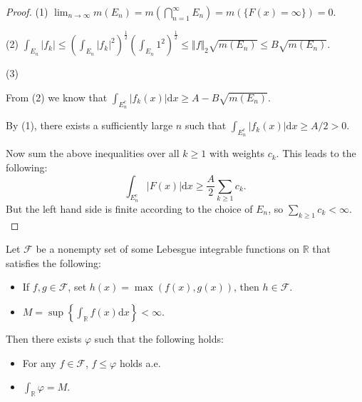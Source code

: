 \begin{proof}
(1)
$
\lim_{n\rightarrow \infty}m( E_n ) =m( \bigcap_{n=1}^{\infty}{E_n} ) =m( \{ F( x ) =\infty \} ) =0.
$
	
(2)
$
\int_{E_n}^{}{|f_k|}\le \left( \int_{E_n}^{}{|f_k|^2} \right) ^{\frac{1}{2}}\left( \int_{E_n}^{}{1^2} \right) ^{\frac{1}{2}}\le \Vert f \Vert_2\sqrt{m( E_n )}\le B\sqrt{m( E_n )}.
$

(3)%
%

From (2) we know that $\int_{E_n^c}|f_k(x)|\mathrm{d}x \ge A-B\sqrt{m(E_n)}$. 

By (1), there exists a sufficiently large $n$ such that $\int_{E_n^c}|f_k(x)|\mathrm{d}x \ge A/2 >0 $.

Now sum the above inequalities over all $k\ge 1$ with weights $c_k$. This leads to the following:
$$\int_{E_n^c}|F(x)|\mathrm{d}x\ge \frac{A}{2} \sum\limits_{k\ge 1}c_k.$$
But the left hand side is finite according to the choice of $E_n$, so $\sum\limits_{k\ge 1}c_k<\infty.$
\end{proof}

\begin{problem}
Let $ \mathcal{F}  $ be a nonempty set of some Lebesgue integrable functions on $ \mathbb{R}  $ that satisfies the following:
\begin{itemize}
\item If $ f,g\in \mathcal{F}  $, set $ h(x)=\max(f(x),g(x)) $, then $ h\in \mathcal{F}  $.
\item $\displaystyle{
 M=\sup\left\{ \int_{\mathbb{R}}^{}{f( x ) \mathrm{d} x} \right\} <\infty
}$.
\end{itemize}
Then there exists $ \varphi $ such that the following holds:
\begin{itemize}
\item For any $ f\in \mathcal{F}  $, $ f\le \varphi $ holds a.e.
\item $ \int_{\mathbb{R} }\varphi=M $.
\end{itemize}
\end{problem}

